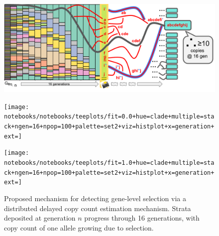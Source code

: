 \begin{figure}
  \centering
  \begin{minipage}{\textwidth} %

    \begin{minipage}{\textwidth}
      \centering
      \includegraphics[height=0.25\textheight]{img/copy-count-snapshot}
    \end{minipage}%
    \hfill
    \begin{minipage}{0.46\textwidth}
      \centering
      \texttt{[image: notebooks/notebooks/teeplots/fit=0.0+hue=clade+multiple=stack+ngen=16+npop=100+palette=set2+viz=histplot+x=generation+ext=]}
    \end{minipage}
    \hfill
    \begin{minipage}{0.46\textwidth}
      \centering
      \texttt{[image: notebooks/notebooks/teeplots/fit=1.0+hue=clade+multiple=stack+ngen=16+npop=100+palette=set2+viz=histplot+x=generation+ext=]}
    \end{minipage}
    \hfill
  \end{minipage}
  \begin{minipage}{\textwidth} %
    \vspace{5ex}
    \caption{
      Proposed mechanism for detecting gene-level selection via a distributed delayed copy count estimation mechanism.
      Strata deposited at generation $n$ progress through 16 generations, with copy count of one allele growing due to selection.
}
\end{minipage}
\end{figure}
